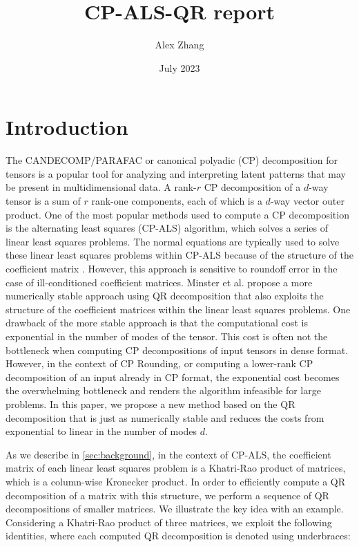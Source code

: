 \documentclass{article}
\title{CP-ALS-QR report}
\author{Alex Zhang}
\date{July 2023}
\begin{document}
\maketitle
\section{Introduction}
The CANDECOMP/PARAFAC or canonical polyadic (CP) decomposition for tensors is a popular tool for analyzing and interpreting latent patterns that may be present in multidimensional data. 
A rank-$r$ CP decomposition of a $d$-way tensor is a sum of $r$ rank-one components, each of which is a $d$-way vector outer product.
One of the most popular methods used to compute a CP decomposition is the alternating least squares (CP-ALS) algorithm, which solves a series of linear least squares problems. 
The normal equations are typically used to solve these linear least squares problems within CP-ALS because of the structure of the coefficient matrix \cite{kolda2009tensor}. 
However, this approach is sensitive to roundoff error in the case of ill-conditioned coefficient matrices. 
Minster et al. \cite{minster2021cp} propose a more numerically stable approach using QR decomposition that also exploits the structure of the coefficient matrices within the linear least squares problems.
One drawback of the more stable approach is that the computational cost is exponential in the number of modes of the tensor.
This cost is often not the bottleneck when computing CP decompositions of input tensors in dense format.
However, in the context of CP Rounding, or computing a lower-rank CP decomposition of an input already in CP format, the exponential cost becomes the overwhelming bottleneck and renders the algorithm infeasible for large problems.
In this paper, we propose a new method based on the QR decomposition that is just as numerically stable and reduces the costs from exponential to linear in the number of modes $d$.


As we describe in \cref{sec:background}, in the context of CP-ALS, the coefficient matrix of each linear least squares problem is a Khatri-Rao product of matrices, which is a column-wise Kronecker product.
In order to efficiently compute a QR decomposition of a matrix with this structure, we perform a sequence of QR decompositions of smaller matrices.
We illustrate the key idea with an example.
Considering a Khatri-Rao product of three matrices, we exploit the following identities, where each computed QR decomposition is denoted using underbraces:
\end{document}

